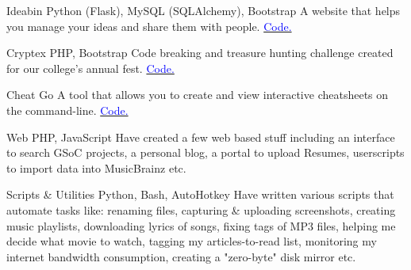     {Ideabin}
    {}
    {\scriptsize Python (Flask), MySQL (SQLAlchemy), Bootstrap}
    {}
    {
        A website that helps you manage your ideas and share them with people.
        \hfill
        \href{http://github.com/ideabin/ideabin/}{\textcolor{blue}{\scriptsize Code.}}
    }
    \vspace*{0.2\baselineskip}

    {Cryptex}
    {}
    {\scriptsize PHP, Bootstrap}
    {}
    {
        Code breaking and treasure hunting challenge created for our college's annual fest.
        \hfill
        \href{http://github.com/jdevlabs/cryptex/}{\textcolor{blue}{\scriptsize Code.}}
    }
    \vspace*{0.2\baselineskip}

\cventry{}
    {Cheat}
    {}
    {\scriptsize Go}
    {}
    {
        A tool that allows you to create and view interactive cheatsheets on the command-line.
        \hfill
        \href{http://github.com/dufferzafar/cheat/}{\textcolor{blue}{\scriptsize Code.}}
    }
    \vspace*{0.2\baselineskip}

 \cventry{}
     {Web}
     {}
     {\scriptsize PHP, JavaScript}
     {}
     {
        Have created a few web based stuff including
        an interface to search GSoC projects,
        a personal blog,
        a portal to upload Resumes,
        userscripts to import data into MusicBrainz etc.
     }
     \vspace*{0.2\baselineskip}

\cventry{}
    {Scripts \& Utilities}
    {}
    {\scriptsize Python, Bash, AutoHotkey}
    {}
    {
        Have written various scripts that automate tasks like:
        renaming files,
        capturing \& uploading screenshots,
        creating music playlists,
        downloading lyrics of songs,
        fixing tags of MP3 files,
        helping me decide what movie to watch,
        tagging my articles-to-read list,
        monitoring my internet bandwidth consumption,
        creating a "zero-byte" disk mirror etc.
    }
    \vspace*{0.2\baselineskip}
